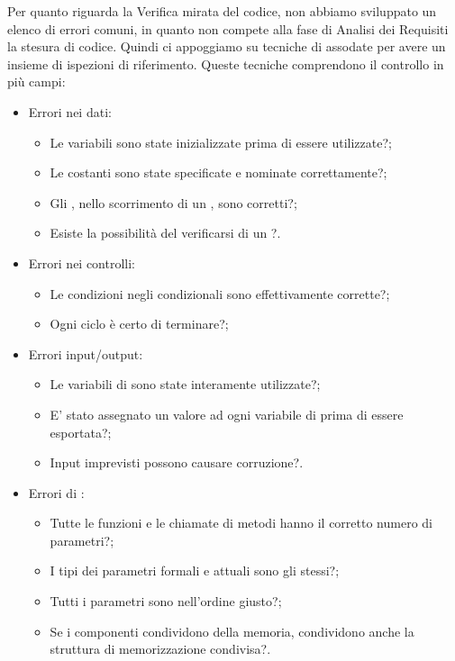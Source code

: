 Per quanto riguarda la Verifica mirata del codice, non abbiamo sviluppato un elenco di errori comuni, in quanto non compete alla fase di Analisi dei Requisiti la stesura di codice.
Quindi ci appoggiamo su tecniche di  assodate per avere un insieme di ispezioni di riferimento. Queste tecniche comprendono il controllo in più campi:
\begin{itemize}
\item Errori nei dati:
\begin{itemize}
\item Le variabili sono state inizializzate prima di essere utilizzate?;
\item Le costanti sono state specificate e nominate correttamente?;
\item Gli  , nello scorrimento di un , sono corretti?;
\item Esiste la possibilità del verificarsi di un ?.
\end{itemize}
\item Errori nei controlli:
\begin{itemize}
\item Le condizioni negli  condizionali sono effettivamente corrette?;
\item Ogni ciclo è certo di terminare?;
\end{itemize}
\item Errori input/output:
\begin{itemize}
\item Le variabili di  sono state interamente utilizzate?;
\item E' stato assegnato un valore ad ogni variabile di  prima di essere esportata?;
\item Input imprevisti possono causare corruzione?.
\end{itemize}
\item Errori di :
\begin{itemize}
\item Tutte le funzioni e le chiamate di metodi hanno il corretto numero di parametri?;
\item I tipi dei parametri formali e attuali sono gli stessi?;
\item Tutti i parametri sono nell'ordine giusto?;
\item Se i componenti condividono della memoria, condividono anche la struttura di memorizzazione condivisa?.
\end{itemize}

\end{itemize}
